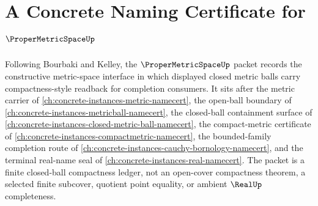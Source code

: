 \chapter{A Concrete Naming Certificate for $\ProperMetricSpaceUp$}
\label{ch:concrete-instances-proper-metric-space-namecert}

Following Bourbaki and Kelley, the $\ProperMetricSpaceUp$ packet records the constructive metric-space interface in which displayed closed metric balls carry compactness-style readback for completion consumers. It sits after the metric carrier of \autoref{ch:concrete-instances-metric-namecert}, the open-ball boundary of \autoref{ch:concrete-instances-metricball-namecert}, the closed-ball containment surface of \autoref{ch:concrete-instances-closed-metric-ball-namecert}, the compact-metric certificate of \autoref{ch:concrete-instances-compactmetric-namecert}, the bounded-family completion route of \autoref{ch:concrete-instances-cauchy-bornology-namecert}, and the terminal real-name seal of \autoref{ch:concrete-instances-real-namecert}. The packet is a finite closed-ball compactness ledger, not an open-cover compactness theorem, a selected finite subcover, quotient point equality, or ambient $\RealUp$ completeness.

